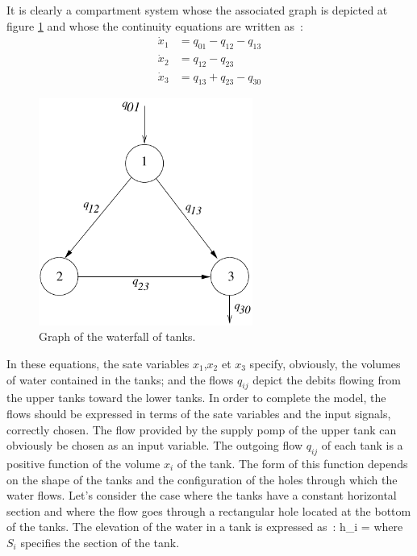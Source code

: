 \begin{exemple}
It is clearly a compartment system whose the associated graph 
is depicted at figure \ref{Fig:grafassoc} and whose the continuity 
equations are written as~:
\begin{equation*} \begin{split} 
\dot x_1 &= q_{01} - q_{12} - q_{13} \\
\dot x_2 &=  q_{12} - q_{23} \\
\dot x_3 &= q_{13} + q_{23} - q_{30} 
\end{split} \end{equation*}
\begin{figure}[h] 
\begin{center}
\includegraphics[width=7cm]{images/grafassoc}
\caption{Graph of the waterfall of tanks.}
\label{Fig:grafassoc}
\end{center} 
\end{figure}
In these equations, the sate variables $x_1$,$ x_2$ et $x_3$ specify, 
obviously, the volumes of water contained in the tanks; and the flows 
$q_{ij}$ depict the debits flowing from the upper tanks toward the lower 
tanks. In order to complete the model, the flows should be expressed in
terms of the sate variables and the input signals, correctly chosen.
The flow provided by the supply pomp of the upper tank can obviously be 
chosen as an input variable. The outgoing flow $q_{ij}$ of each tank 
is a positive function of the volume $x_i$ of the tank. The form of 
this function depends on the shape of the tanks and the configuration of 
the holes through which the water flows. Let's consider the case where the tanks 
have a constant horizontal section and where the flow goes through a 
rectangular hole located at the bottom of the tanks. The elevation of the water in 
a tank is expressed as~:
\eqnn
h_i = 
\eeqnn
where $S_{i}$ specifies the section of the tank.

\end{exemple}

